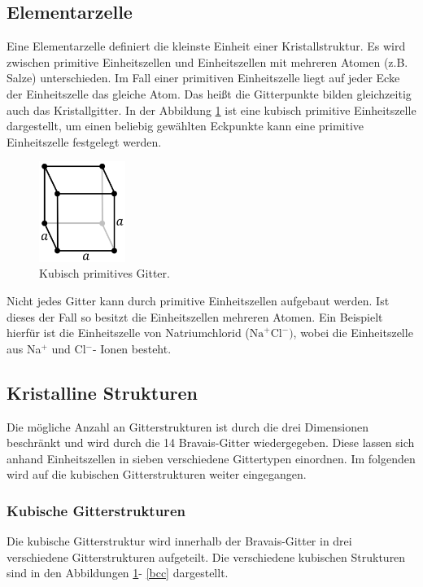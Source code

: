 \subsection{Elementarzelle}

Eine Elementarzelle definiert die kleinste Einheit einer Kristallstruktur.
Es wird zwischen primitive Einheitszellen und Einheitszellen mit mehreren Atomen
(z.B. Salze) unterschieden. Im Fall einer primitiven Einheitszelle
liegt auf jeder Ecke der Einheitszelle das gleiche Atom. Das heißt die Gitterpunkte
bilden gleichzeitig auch das Kristallgitter. In der Abbildung \ref{primitiv} ist
eine kubisch primitive Einheitszelle dargestellt, um einen beliebig gewählten Eckpunkte kann
eine primitive Einheitszelle festgelegt werden.

\begin{figure}
    \centering
    \includegraphics[width=0.25\textwidth]{ressources/primitiv.png}
    \caption{Kubisch primitives Gitter\cite{skript}.}
    \label{primitiv}
\end{figure}
Nicht jedes Gitter kann durch primitive Einheitszellen aufgebaut werden.
Ist dieses der Fall so besitzt die Einheitszellen mehreren Atomen.
Ein Beispielt hierfür ist die Einheitszelle von Natriumchlorid ($\text{Na}^+\text{Cl}^-)$,
wobei die Einheitszelle aus Na$^+$ und Cl$^-$- Ionen besteht.
\subsection{Kristalline Strukturen}

Die mögliche Anzahl an Gitterstrukturen ist durch die drei Dimensionen beschränkt und
wird durch die 14 Bravais-Gitter wiedergegeben. Diese lassen sich anhand
Einheitszellen in sieben verschiedene Gittertypen einordnen. Im folgenden
wird auf die kubischen Gitterstrukturen weiter eingegangen.
\subsubsection{Kubische Gitterstrukturen}
Die kubische Gitterstruktur wird innerhalb der Bravais-Gitter in drei
verschiedene Gitterstrukturen aufgeteilt. Die verschiedene kubischen Strukturen
sind in den Abbildungen \ref{primitiv}- \ref{bcc} dargestellt.

